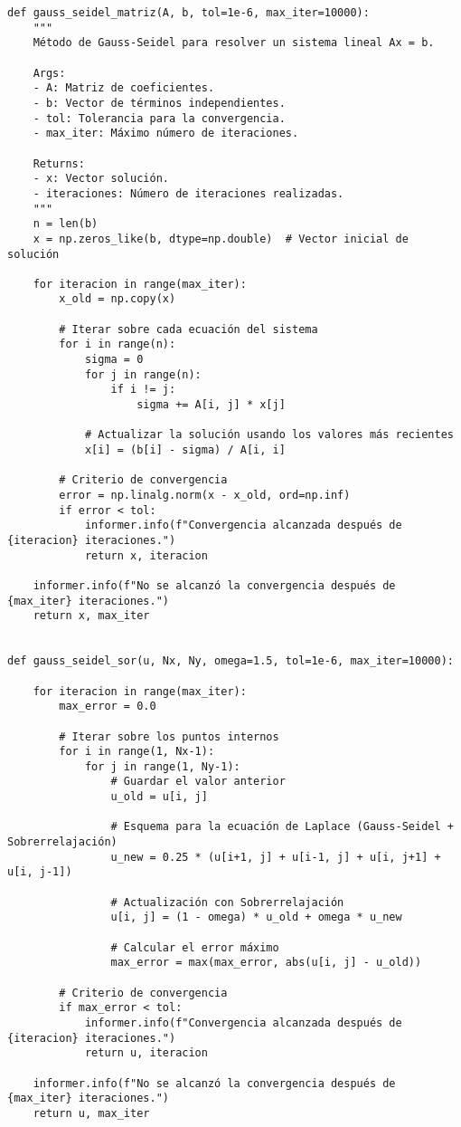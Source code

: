 \begin{verbatim}
def gauss_seidel_matriz(A, b, tol=1e-6, max_iter=10000):
    """
    Método de Gauss-Seidel para resolver un sistema lineal Ax = b.
    
    Args:
    - A: Matriz de coeficientes.
    - b: Vector de términos independientes.
    - tol: Tolerancia para la convergencia.
    - max_iter: Máximo número de iteraciones.
    
    Returns:
    - x: Vector solución.
    - iteraciones: Número de iteraciones realizadas.
    """
    n = len(b)
    x = np.zeros_like(b, dtype=np.double)  # Vector inicial de solución
    
    for iteracion in range(max_iter):
        x_old = np.copy(x)
        
        # Iterar sobre cada ecuación del sistema
        for i in range(n):
            sigma = 0
            for j in range(n):
                if i != j:
                    sigma += A[i, j] * x[j]
            
            # Actualizar la solución usando los valores más recientes
            x[i] = (b[i] - sigma) / A[i, i]
        
        # Criterio de convergencia
        error = np.linalg.norm(x - x_old, ord=np.inf)
        if error < tol:
            informer.info(f"Convergencia alcanzada después de {iteracion} iteraciones.")
            return x, iteracion
    
    informer.info(f"No se alcanzó la convergencia después de {max_iter} iteraciones.")
    return x, max_iter


def gauss_seidel_sor(u, Nx, Ny, omega=1.5, tol=1e-6, max_iter=10000):
    
    for iteracion in range(max_iter):
        max_error = 0.0
        
        # Iterar sobre los puntos internos
        for i in range(1, Nx-1):
            for j in range(1, Ny-1):
                # Guardar el valor anterior
                u_old = u[i, j]
                
                # Esquema para la ecuación de Laplace (Gauss-Seidel + Sobrerrelajación)
                u_new = 0.25 * (u[i+1, j] + u[i-1, j] + u[i, j+1] + u[i, j-1])
                
                # Actualización con Sobrerrelajación
                u[i, j] = (1 - omega) * u_old + omega * u_new
                
                # Calcular el error máximo
                max_error = max(max_error, abs(u[i, j] - u_old))
        
        # Criterio de convergencia
        if max_error < tol:
            informer.info(f"Convergencia alcanzada después de {iteracion} iteraciones.")
            return u, iteracion
    
    informer.info(f"No se alcanzó la convergencia después de {max_iter} iteraciones.")
    return u, max_iter
\end{verbatim}


